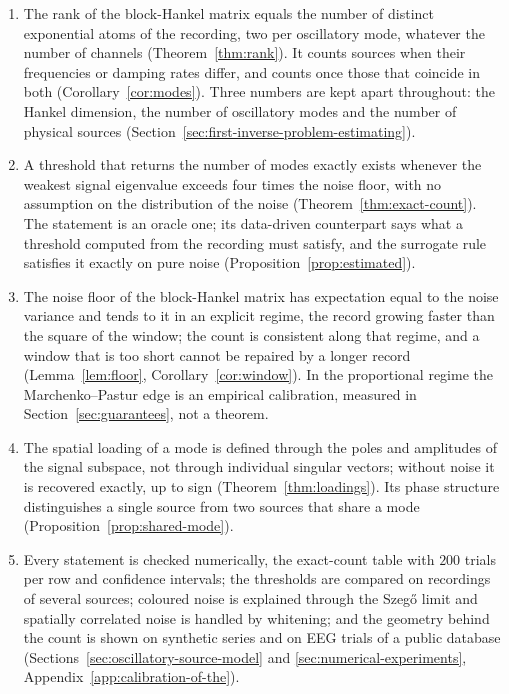 \documentclass{article}
\begin{document}
\begin{enumerate}
\item
  The rank of the block-Hankel matrix equals the number of distinct exponential atoms of the recording, two per oscillatory mode, whatever the number of channels (Theorem~\ref{thm:rank}). It counts sources when their frequencies or damping rates differ, and counts once those that coincide in both (Corollary~\ref{cor:modes}). Three numbers are kept apart throughout: the Hankel dimension, the number of oscillatory modes and the number of physical sources (Section~\ref{sec:first-inverse-problem-estimating}).
\item
  A threshold that returns the number of modes exactly exists whenever the weakest signal eigenvalue exceeds four times the noise floor, with no assumption on the distribution of the noise (Theorem~\ref{thm:exact-count}). The statement is an oracle one; its data-driven counterpart says what a threshold computed from the recording must satisfy, and the surrogate rule satisfies it exactly on pure noise (Proposition~\ref{prop:estimated}).
\item
  The noise floor of the block-Hankel matrix has expectation equal to the noise variance and tends to it in an explicit regime, the record growing faster than the square of the window; the count is consistent along that regime, and a window that is too short cannot be repaired by a longer record (Lemma~\ref{lem:floor}, Corollary~\ref{cor:window}). In the proportional regime the Marchenko--Pastur edge is an empirical calibration, measured in Section~\ref{sec:guarantees}, not a theorem.
\item
  The spatial loading of a mode is defined through the poles and amplitudes of the signal subspace, not through individual singular vectors; without noise it is recovered exactly, up to sign (Theorem~\ref{thm:loadings}). Its phase structure distinguishes a single source from two sources that share a mode (Proposition~\ref{prop:shared-mode}).
\item
  Every statement is checked numerically, the exact-count table with $200$ trials per row and confidence intervals; the thresholds are compared on recordings of several sources; coloured noise is explained through the Szeg\H{o} limit and spatially correlated noise is handled by whitening; and the geometry behind the count is shown on synthetic series and on EEG trials of a public database (Sections~\ref{sec:oscillatory-source-model} and \ref{sec:numerical-experiments}, Appendix~\ref{app:calibration-of-the}).
\end{enumerate}
\end{document}

